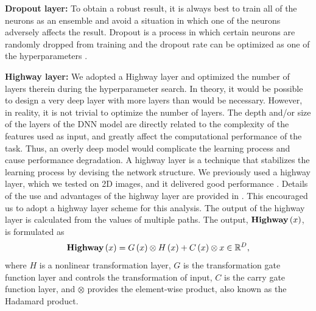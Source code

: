 \documentclass[useamsfonts]{pasj01}
\begin{document}
{\bf Dropout layer:}
To obtain a robust result, it is always best to train all of the neurons as an ensemble and avoid a situation in which one of the neurons adversely affects the result. Dropout is a process in which certain neurons are randomly dropped from training and the dropout rate can be optimized as one of the hyperparameters \citep{dropout}.

{\bf Highway layer:}
We adopted a Highway layer \citep{srivastava15a} and optimized the number of layers therein during the hyperparameter search. In theory, it would be possible to design a very deep layer with more layers than would be necessary. However, in reality, it is not trivial to optimize the number of layers.   
The depth and/or size of the layers of the DNN model are directly related to the complexity of the features used as input, and greatly affect the computational performance of the task.  
Thus, an overly deep model would complicate the learning process and cause performance degradation.
A highway layer is a technique that stabilizes the learning process by devising the network structure.
We previously used a highway layer, which we tested on 2D images, and it delivered good performance \citep{Kimura17}. Details of the use and advantages of the highway layer are provided in \citet{Kimura17}. This encouraged us to adopt a highway layer scheme for this analysis.
The output of the highway layer is calculated from the values of multiple paths.
The output, ${\bf Highway} \left(x\right)$, is formulated as
\begin{equation}
    {\bf Highway} \left(x\right) = G \left(x\right) \otimes H \left(x\right) + C \left(x\right) \otimes x \in \mathbb{R}^D,
\end{equation}
where $H$ is a nonlinear transformation layer, $G$ is the transformation gate function layer and controls the transformation of input, $C$ is the carry gate function layer, and $\otimes$ provides the element-wise product, also known as the Hadamard product.
\end{document}
